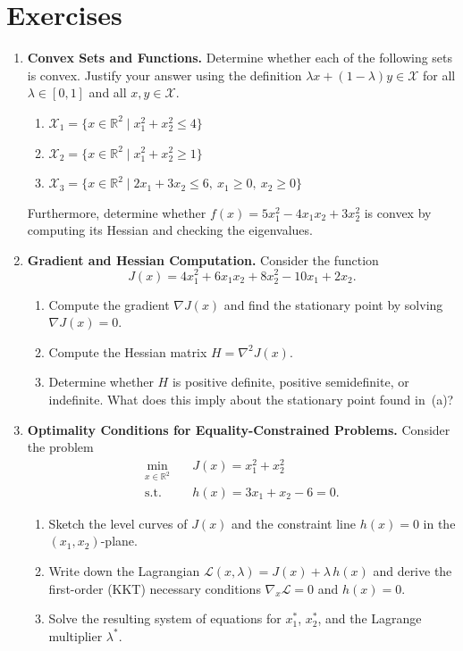\section*{Exercises}
\begin{enumerate}
	\item \textbf{Convex Sets and Functions.}
	Determine whether each of the following sets is convex. Justify your answer using the definition $\lambda x + (1-\lambda)y \in \mathcal{X}$ for all $\lambda \in [0,1]$ and all $x, y \in \mathcal{X}$.
	\begin{enumerate}
		\item $\mathcal{X}_1 = \{x \in \mathbb{R}^2 \mid x_1^2 + x_2^2 \leq 4\}$
		\item $\mathcal{X}_2 = \{x \in \mathbb{R}^2 \mid x_1^2 + x_2^2 \geq 1\}$
		\item $\mathcal{X}_3 = \{x \in \mathbb{R}^2 \mid 2x_1 + 3x_2 \leq 6, \ x_1 \geq 0, \ x_2 \geq 0\}$
	\end{enumerate}
	Furthermore, determine whether $f(x) = 5x_1^2 - 4x_1 x_2 + 3x_2^2$ is convex by computing its Hessian and checking the eigenvalues.

	\item \textbf{Gradient and Hessian Computation.}
	Consider the function
	\[
	J(x) = 4x_1^2 + 6x_1 x_2 + 8x_2^2 - 10x_1 + 2x_2.
	\]
	\begin{enumerate}
		\item Compute the gradient $\nabla J(x)$ and find the stationary point by solving $\nabla J(x) = 0$.
		\item Compute the Hessian matrix $H = \nabla^2 J(x)$.
		\item Determine whether $H$ is positive definite, positive semidefinite, or indefinite. What does this imply about the stationary point found in~(a)?
	\end{enumerate}

	\item \textbf{Optimality Conditions for Equality-Constrained Problems.}
	Consider the problem
	\begin{equation*}
		\begin{aligned}
			\min_{x \in \mathbb{R}^2} \quad & J(x) = x_1^2 + x_2^2 \\
			\text{s.t.} \quad & h(x) = 3x_1 + x_2 - 6 = 0.
		\end{aligned}
	\end{equation*}
	\begin{enumerate}
		\item Sketch the level curves of $J(x)$ and the constraint line $h(x)=0$ in the $(x_1, x_2)$-plane.
		\item Write down the Lagrangian $\mathcal{L}(x, \lambda) = J(x) + \lambda\, h(x)$ and derive the first-order (KKT) necessary conditions $\nabla_x \mathcal{L} = 0$ and $h(x) = 0$.
		\item Solve the resulting system of equations for $x_1^*$, $x_2^*$, and the Lagrange multiplier $\lambda^*$.
	\end{enumerate}


\end{enumerate}
